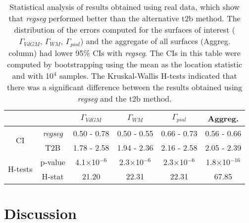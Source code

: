 \documentclass[3p,authoryear,fleqn]{elsarticle}
\providecommand{\regseg}{\emph{regseg}}
\begin{document}
\begin{table}
    \centering
    \footnotesize
    \tabcolsep=0.08cm
    \begin{tabular}{cccccc}
    & & $\Gamma_{VdGM}$  & $\Gamma_{WM}$ & $\Gamma_{pial}$ & Aggreg. \\
    \hline
    \multirow{2}{*}{CI}
       & \regseg{}        & 0.50 - 0.78 & 0.50 - 0.55 & 0.66 - 0.73 & 0.56 - 0.66 \\
       & T2B                  & 1.78 - 2.58 & 1.94 - 2.36 & 2.16 - 2.58 & 2.05 - 2.39 \\
    \hline
    \multirow{2}{*}{H-tests}
       & p-value  & 4.1$\times$10$^{-6}$& 2.3$\times$10$^{-6}$& 2.3$\times$10$^{-6}$ & 1.8$\times$10$^{-16}$ \\
       & H-stat   & 21.20               & 22.31               & 22.31                & 67.85              \\
    \hline
    \end{tabular}
    \caption{Statistical analysis of results obtained using real data, which show that \regseg{} performed better than
    the alternative \acrfull{t2b} method.
    The distribution of the errors computed for the surfaces of interest ($\Gamma_{VdGM}$, $\Gamma_{WM}$, $\Gamma_{pial}$)
      and the aggregate of all surfaces (Aggreg. column) had lower 95\% CIs with \regseg{}.
   The CIs in this table were computed by bootstrapping using the mean as the location statistic and with 10$^4$ samples.
    The Kruskal-Wallis H-tests indicated that there was a significant difference between the results obtained using \regseg{} and
      the \gls*{t2b} method.
    }\label{tab:results_real}
\end{table}

\begin{figure*}
  \centering
  
  \caption{A. Example of a visual assessment report, which was generated automatically by the evaluation tool.
    Each view shows one component of the input image (in this case, the \gls*{fa} map), the ground-truth locations
    of the surfaces (green contours), and the resulting surfaces obtained with the test method (yellow contours).
  The first two rows show axial slices for \regseg{} and the \acrfull*{t2b} method, while the last two rows
    show the corresponding sagittal views.
  The coronal view is omitted because it was the least informative due to the directional property
    of the distortions.
  Specific regions where \regseg{} outperformed \gls*{t2b} are enlarged.
  B. Violin plots of the error distributions for each surface, which show the voxel size of the \gls*{dmri} images
    (1.25 mm), thereby supporting the improved results obtained by \regseg{} with the proposed settings.
  }\label{fig:results_real}
\end{figure*}  
\makeatletter{}\section{Discussion}
\label{sec:discussion}
\end{document}
